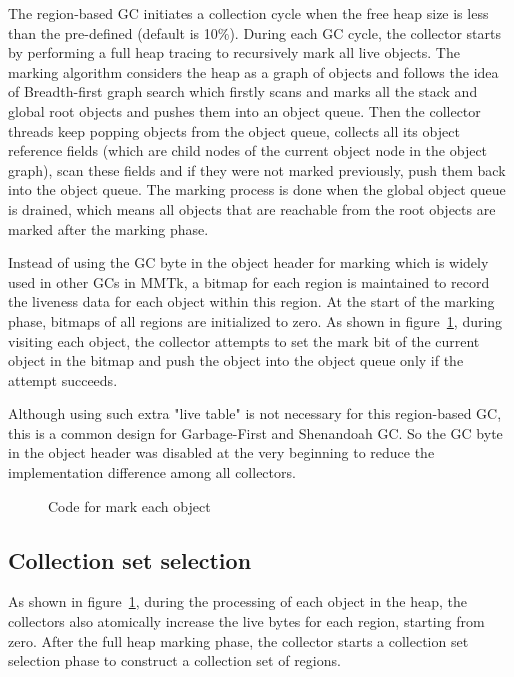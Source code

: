 The region-based GC initiates a collection cycle when the free heap size is less than
the pre-defined  (default is 10\%). During each GC cycle,
the collector starts by performing a full heap tracing to recursively mark all live objects.
The marking algorithm considers the heap as a graph of objects and follows the idea of Breadth-first graph search
which firstly scans and marks all the stack and global root objects and pushes them into an object queue.
Then the collector threads keep popping objects from the object queue, collects all its
object reference fields (which are child nodes of the current object node in the object graph), scan these
fields and if they were not marked previously, push them back into the object queue.
The marking process is done when the global object queue is drained, which means all objects that are reachable
from the root objects are marked after the marking phase.

Instead of using the GC byte in the object header for marking which is widely used in other GCs in MMTk,
a bitmap for each region is maintained to record the liveness data for each object within this region.
At the start of the marking phase, bitmaps of all regions are initialized to zero.
As shown in figure~\ref{fig:tracemarkobject}, during visiting each object, the collector attempts to set the mark bit
of the current object in the bitmap and push the object into the object queue only if the attempt succeeds.

Although using such extra "live table" is not necessary for this region-based GC,
this is a common design for Garbage-First and Shenandoah GC.
So the GC byte in the object header was disabled at the very beginning to reduce the implementation difference among all collectors.

\begin{figure}
  \centering
  
  \caption{Code for mark each object}
  \label{fig:tracemarkobject}
\end{figure}

\subsection{Collection set selection}

As shown in figure~\ref{fig:tracemarkobject}, during the processing of each object in the heap,
the collectors also atomically increase the live bytes for each region, starting from zero.
After the full heap marking phase, the collector starts a collection set selection phase to construct
a collection set of regions.

